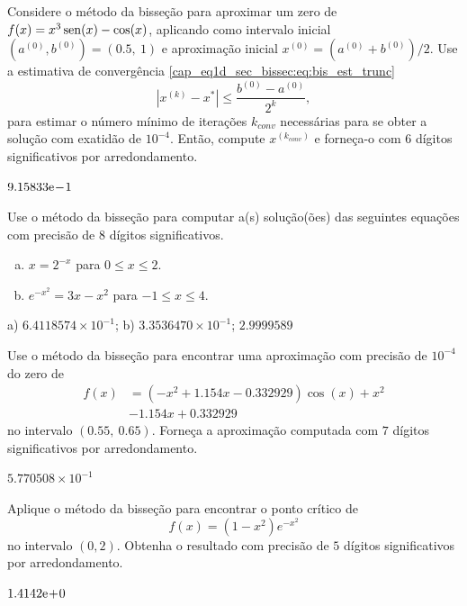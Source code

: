 \begin{exer}
  Considere o método da bisseção para aproximar um zero de $f(x)=x^3\operatorname{sen}(x)-\cos(x)$, aplicando como intervalo inicial $(a^{(0)}, b^{(0)}) = (0.5, ~1)$ e aproximação inicial $x^{(0)}=(a^{(0)}+b^{(0)})/2$. Use a estimativa de convergência \eqref{cap_eq1d_sec_bissec:eq:bis_est_trunc}
  \begin{equation}
    \left|x^{(k)} - x^{*}\right| \leq \frac{b^{(0)}-a^{(0)}}{2^k},
  \end{equation}
para estimar o número mínimo de iterações $k_{conv}$ necessárias para se obter a solução com exatidão de $10^{-4}$. Então, compute $x^{(k_{conv})}$ e forneça-o com $6$ dígitos significativos por arredondamento.
\end{exer}
\begin{resp}
  $9.15833\mathrm{e}\!-\!1$
\end{resp}

\begin{exer}
  Use o método da bisseção para computar a(s) solução(ões) das seguintes equações com precisão de 8 dígitos significativos.
  \begin{enumerate}[a)]
  \item $x = 2^{-x}$ para $0\leq x \leq 2$.
  \item $e^{-x^2} = 3x - x^2$ para $-1\leq x\leq 4$.
  \end{enumerate}
\end{exer}
\begin{resp}
  a) $6.4118574\times 10^{-1}$; b) $3.3536470\times 10^{-1}$; $2.9999589$
\end{resp}

\begin{exer}
  Use o método da bisseção para encontrar uma aproximação com precisão de $10^{-4}$ do zero de
  \begin{align}
    f(x) &= (-x^2+1.154x-0.332929)\cos(x) + x^2 \nonumber\\
         &- 1.154x + 0.332929
  \end{align}
no intervalo $(0.55, ~0.65)$. Forneça a aproximação computada com $7$ dígitos significativos por arredondamento.
\end{exer}
\begin{resp}
  $5.770508\times 10^{-1}$
\end{resp}

\begin{exer}
  Aplique o método da bisseção para encontrar o ponto crítico de
  \begin{equation}
    f(x) = (1-x^2)e^{-x^2}
  \end{equation}
  no intervalo $(0, 2)$. Obtenha o resultado com precisão de $5$ dígitos significativos por arredondamento.
\end{exer}
\begin{resp}
  $1.4142\mathrm{e}\!+\!0$
\end{resp}

